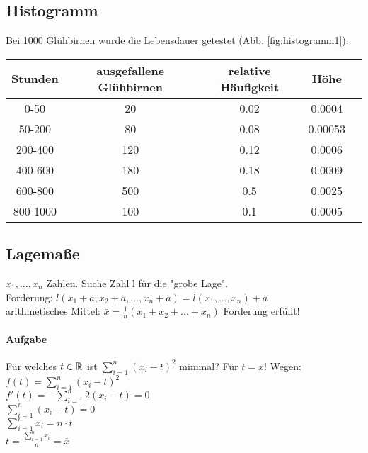 
\subsection{Histogramm}

Bei 1000 Glühbirnen wurde die Lebensdauer getestet (Abb. \ref{fig:histogramm1}).\\ %
\begin{tabular}{|c|c|c|c|c|}
\hline Stunden & ausgefallene Glühbirnen & relative Häufigkeit & Höhe \\ 
\hline 0-50 & 20 & 0.02 & 0.0004 \\ 
\hline 50-200 & 80 & 0.08 & 0.00053 \\ 
\hline 200-400 & 120 & 0.12 & 0.0006 \\ 
\hline 400-600 & 180 & 0.18 & 0.0009 \\ 
\hline 600-800 & 500 & 0.5 & 0.0025 \\ 
\hline 800-1000 & 100 & 0.1 & 0.0005 \\ 
\hline 
\end{tabular} 

\subsection{Lagemaße}
$ x_1, ..., x_n $ Zahlen. Suche Zahl l für die "grobe Lage".\\
Forderung: $ l(x_1+a, x_2+a, ..., x_n+a) = l(x_1, ..., x_n) + a $\\
arithmetisches Mittel: $ \overline{x} = \frac{1}{n}(x_1+x_2+...+x_n) $ Forderung erfüllt!

\paragraph{Aufgabe} Für welches $t\in \mathbb{R}$ ist $ \sum_{i=1}^{n}(x_i-t)^2 $ minimal? Für $t=\overline{x}$! Wegen: $ f(t)=\sum_{i=1}^{n}(x_i-t)^2 $\\
$ f'(t) = -\sum_{i=1}^{n}2(x_i-t) = 0 $\\
$ \sum_{i=1}^{n}(x_i-t) = 0 $\\
$ \sum_{i=1}^{n} x_i = n\cdot t $\\
$ t = \frac{\sum_{i=1}^{n}x_i}{n} = \overline{x} $

